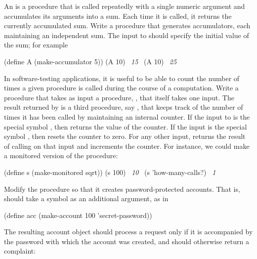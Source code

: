 \begin{exerciseGroup}
\label{Exercise 3.1}
 An  is a
procedure that is called repeatedly with a single numeric argument and
accumulates its arguments into a sum.  Each time it is called, it returns the
currently accumulated sum.  Write a procedure  that
generates accumulators, each maintaining an independent sum.  The input to
 should specify the initial value of the sum; for
example

\begin{codeBlock}
(define A (make-accumulator 5))
(A 10)
~\textit{15}~
(A 10)
~\textit{25}~
\end{codeBlock}

\label{Exercise 3.2}
 In software-testing applications,
it is useful to be able to count the number of times a given procedure is
called during the course of a computation.  Write a procedure
 that takes as input a procedure, , that itself
takes one input.  The result returned by  is a third
procedure, say , that keeps track of the number of times it has been
called by maintaining an internal counter.  If the input to  is the
special symbol , then  returns the value of the
counter.  If the input is the special symbol , then 
resets the counter to zero.  For any other input,  returns the result
of calling  on that input and increments the counter.  For instance, we
could make a monitored version of the  procedure:

\begin{codeBlock}
(define s (make-monitored sqrt))
(s 100)
~\textit{10}~
(s 'how-many-calls?)
~\textit{1}~
\end{codeBlock}

\label{Exercise 3.3}
 Modify the 
procedure so that it creates password-protected accounts.  That is,
 should take a symbol as an additional argument, as in

\begin{codeBlock}
(define acc (make-account 100 'secret-password))
\end{codeBlock}

The resulting account object should process a request only if it is accompanied
by the password with which the account was created, and should otherwise return
a complaint:


\end{exerciseGroup}
